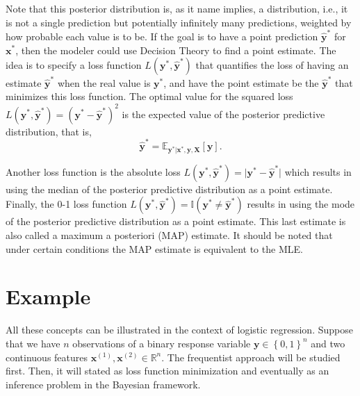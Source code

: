 Note that this posterior distribution is, as it name implies, a distribution, i.e., it is not a single prediction but potentially infinitely many predictions, weighted by how probable each value is to be.
If the goal is to have a point prediction $\hat{\boldsymbol{y}}^*$ for $\boldsymbol{x}^*$, then the modeler could use Decision Theory to find a point estimate. The idea is to specify a loss function $L(\boldsymbol{y}^*, \hat{\boldsymbol{y}}^*)$ that quantifies the loss of having an estimate $\hat{\boldsymbol{y}}^*$ when the real value is $\boldsymbol{y}^*$, and have the point estimate be the $\hat{\boldsymbol{y}}^*$ that minimizes this loss function.
The optimal value for the squared loss $L(\boldsymbol{y}^*, \hat{\boldsymbol{y}}^*) = (\boldsymbol{y}^* - \hat{\boldsymbol{y}}^*)^2$ is the expected value of the posterior predictive distribution, that is,
\begin{equation}
  \hat{\boldsymbol{y}}^* = \mathbb{E}_{\boldsymbol{y}^* | \boldsymbol{x}^*, \boldsymbol{y}, \boldsymbol{X}} \left[ \boldsymbol{y} \right].
\end{equation}

Another loss function is the absolute loss $L(\boldsymbol{y}^*, \hat{\boldsymbol{y}}^*) = \vert \boldsymbol{y}^* - \hat{\boldsymbol{y}}^* \vert$ which results in using the median of the posterior predictive distribution as a point estimate. Finally, the 0-1 loss function $L(\boldsymbol{y}^*, \hat{\boldsymbol{y}}^*) = \mathbb{I}(\boldsymbol{y}^* \neq \hat{\boldsymbol{y}}^* )$ results in using the mode of the posterior predictive distribution as a point estimate. This last estimate is also called a maximum a posteriori (MAP) estimate. It should be noted that under certain conditions the MAP estimate is equivalent to the MLE.

\section{Example}

All these concepts can be illustrated in the context of logistic regression. Suppose that we have $n$ observations of a binary response variable $\boldsymbol{y} \in \left\{0, 1\right\}^n$ and two continuous features $\boldsymbol{x}^{(1)}, \boldsymbol{x}^{(2)} \in \mathbb{R}^n$. The frequentist approach will be studied first.
Then, it will stated as loss function minimization and eventually as an inference problem in the Bayesian framework.

